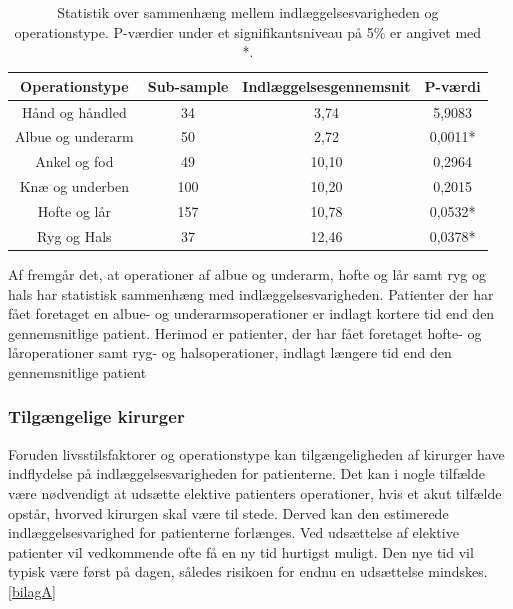 \begin{table}[H]
\centering
\begin{tabular}{|c|c|c|c|}
\hline
\textbf{Operationstype} & \textbf{Sub-sample} & \textbf{Indlæggelsesgennemsnit} & \textbf{P-værdi} \\ \hline
Hånd og håndled   & 34                  & 3,74                            & 5,9083           \\ \hline
Albue og underarm & 50                  & 2,72                            & 0,0011*          \\ \hline
Ankel og fod      & 49                  & 10,10                           & 0,2964           \\ \hline
Knæ og underben   & 100                 & 10,20                           & 0,2015           \\ \hline
Hofte og lår      & 157                 & 10,78                           & 0,0532*          \\ \hline
Ryg og Hals       & 37                  & 12,46                           & 0,0378*          \\ \hline
\end{tabular}
\caption{Statistik over sammenhæng mellem indlæggelsesvarigheden og operationstype. P-værdier under et signifikantsniveau på 5\% er angivet med *.}
\label{optypeogindlaegtab}
\end{table}

\noindent
Af  fremgår det, at  operationer af albue og underarm, hofte og lår samt ryg og hals har statistisk sammenhæng med indlæggelsesvarigheden. Patienter der har fået foretaget en albue- og underarmsoperationer er indlagt kortere tid end den gennemsnitlige patient. Herimod er patienter, der har fået foretaget hofte- og låroperationer samt ryg- og halsoperationer, indlagt længere tid end den gennemsnitlige patient


\subsubsection{Tilgængelige kirurger}
Foruden livsstilsfaktorer og operationstype kan tilgængeligheden af kirurger have indflydelse på indlæggelsesvarigheden for patienterne. Det kan i nogle tilfælde være nødvendigt at udsætte elektive patienters operationer, hvis et akut tilfælde opstår, hvorved kirurgen skal være til stede. Derved kan den estimerede indlæggelsesvarighed for patienterne forlænges. Ved udsættelse af elektive patienter vil vedkommende ofte få en ny tid hurtigst muligt. Den nye tid vil typisk være først på dagen, således risikoen for endnu en udsættelse mindskes.\ref{bilagA}